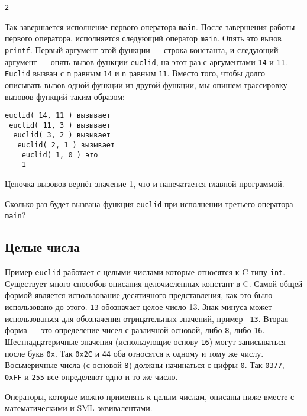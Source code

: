 \begin{lstlisting}
2
\end{lstlisting}

Так завершается исполнение первого оператора \lstinline|main|. После завершения работы первого оператора, исполняется следующий оператор \lstinline|main|. Опять это вызов \lstinline|printf|. Первый аргумент этой функции --- строка константа, и следующий аргумент --- опять вызов функции \lstinline|euclid|, на этот раз с аргументами \lstinline|14| и \lstinline|11|. \lstinline|Euclid| вызван с \lstinline|m| равным \lstinline|14| и \lstinline|n| равным \lstinline|11|. Вместо того, чтобы долго описывать вызов одной функции из другой функции, мы опишем трассировку вызовов функций таким образом:

\begin{lstlisting}
euclid( 14, 11 ) вызывает
 euclid( 11, 3 ) вызывает
  euclid( 3, 2 ) вызывает
   euclid( 2, 1 ) вызывает
    euclid( 1, 0 ) это
    1
\end{lstlisting}

Цепочка вызовов вернёт значение 1, что и напечатается главной программой.

\exercise Сколько раз будет вызвана функция \lstinline|euclid| при исполнении третьего оператора \lstinline|main|?\label{ex_2.1}

\subsection{Целые числа}\label{Integers}

Пример \lstinline|euclid| работает с целыми числами которые относятся к C типу \lstinline|int|. Существует много способов описания целочисленных констант в C. Самой общей формой является использование десятичного представления, как это было использовано до этого. \lstinline|13| обозначает целое число 13. Знак минуса может использоваться для обозначения отрицательных значений, пример \lstinline|-13|. Вторая форма --- это определение чисел с различной основой, либо \lstinline|8|, либо \lstinline|16|. Шестнадцатеричные значения (использующие основу \lstinline|16|) могут записываться после букв \lstinline|0x|. Так \lstinline|0x2C| и \lstinline|44| оба относятся к одному и тому же числу. Восьмеричные числа (с основой \lstinline|8|) должны начинаться с цифры \lstinline|0|. Так \lstinline|0377|, \lstinline|0xFF| и \lstinline|255| все определяют одно и то же число.

Операторы, которые можно применять к целым числам, описаны ниже вместе с математическими и SML эквивалентами.

